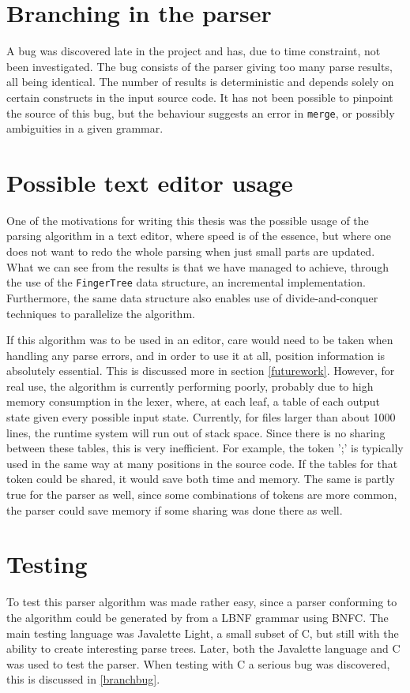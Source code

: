 \documentclass[a4paper,12pt,notitlepage]{report}
\begin{document}
\section{Branching in the parser}
A bug was discovered late in the project and has, due to time constraint, not
been investigated. The bug consists of the parser giving too many parse 
results, all being identical. The number of results is deterministic and depends
solely on certain constructs in the input source code. It has not been possible
to pinpoint the source of this bug, but the behaviour suggests an error in
\texttt{merge}, or possibly ambiguities in a given grammar. \label{branchbug}

\section{Possible text editor usage}
One of the motivations for writing this thesis was the possible usage of the
parsing algorithm in a text editor, where speed is of the essence, but where one
does not want to redo the whole parsing when just small parts are updated. What
we can see from the results is that we have managed to achieve, through the use
of the \texttt{FingerTree} data structure, an incremental implementation.
Furthermore, the same data structure also enables use of divide-and-conquer
techniques to parallelize the algorithm. 

If this algorithm was to be used in an editor, care would need to be taken when
handling any parse errors, and in order to use it at all, position information
is absolutely essential. This is discussed more in section \ref{futurework}.
However, for real use, the algorithm is currently performing poorly, probably
due to high memory consumption in the lexer, where, at each leaf, a table of
each output state given every possible input state.  Currently, for files larger
than about 1000 lines, the runtime system will run out of stack space.  Since
there is no sharing between these tables, this is very inefficient. For example,
the token ';' is typically used in the same way at many positions in the source
code. If the tables for that token could be shared, it would save both time and
memory. The same is partly true for the parser as well, since some combinations
of tokens are more common, the parser could save memory if some sharing was done
there as well.

\section{Testing}
To test this parser algorithm was made rather easy, since a parser conforming to
the algorithm could be generated by from a LBNF grammar using BNFC. The main
testing language was Javalette Light, a small subset of C, but still with the
ability to create interesting parse trees. Later, both the Javalette language
and C was used to test the parser. When testing with C a serious bug was
discovered, this is discussed in \ref{branchbug}.
\end{document}
